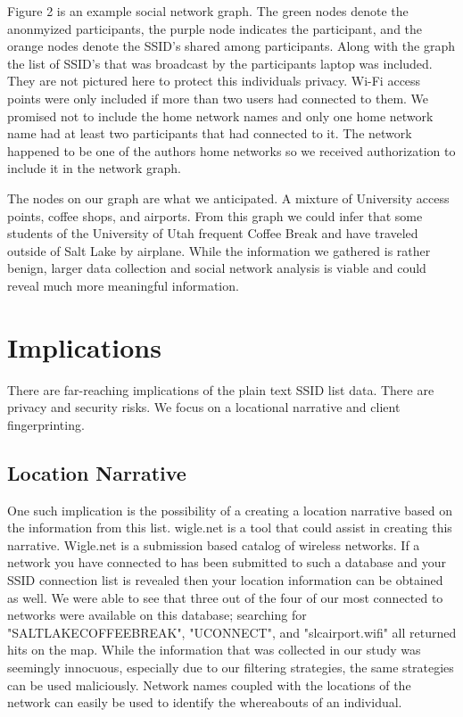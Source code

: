 \documentclass[letterpaper,twocolumn,10pt]{article}
\begin{document}
Figure 2 is an example social network graph. The green nodes denote the anonmyized participants, the purple node indicates the participant, and the orange nodes denote the SSID's shared among participants. Along with the graph the list of SSID's that was broadcast by the participants laptop was included. They are not pictured here to protect this individuals privacy. Wi-Fi access points were only included if more than two users had connected to them. We promised not to include the home network names and only one home network name had at least two participants that had connected to it. The network happened to be one of the authors home networks so we received authorization to include it in the network graph. 

The nodes on our graph are what we anticipated. A mixture of University access points, coffee shops, and airports. From this graph we could infer that some students of the University of Utah frequent Coffee Break and have traveled outside of Salt Lake by airplane. While the information we gathered is rather benign, larger data collection and social network analysis is viable and could reveal much more meaningful information. 

\section{Implications}

There are far-reaching implications of the plain text SSID list data. There are privacy and security risks. We focus on a locational narrative and client fingerprinting.

\subsection{Location Narrative}
 One such implication is the possibility of a creating a location narrative based on  the information from this list. 
wigle.net is a tool that could assist in creating this narrative. Wigle.net is a 
submission based catalog of wireless networks. If a network you have connected to has been 
submitted to such a database and your SSID connection list is revealed then your location 
information can be obtained as well. We were able to see that three out of the four of our
most connected to networks were available on this database; searching for "SALTLAKECOFFEEBREAK", 
"UCONNECT", and "slcairport.wifi" all returned hits on the map. 
While the information that was collected in our study was seemingly innocuous, especially 
due to our filtering strategies, the same strategies can be used maliciously. 
Network names coupled with the locations of the network can easily be used to identify 
the whereabouts of an individual. 
\end{document}
